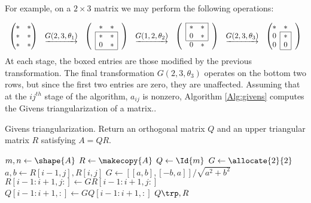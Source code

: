 For example, on a $2 \times 3$ matrix we may perform the following operations:

\def\mc#1{\multicolumn{1}{c|}{#1}}
\def\lc#1{\multicolumn{1}{|c}{#1}}
\[
\begin{array}{ccccccc}
\begin{pmatrix}
*&*\\
*&*\\
*&*
\end{pmatrix}
&
\underrightarrow{G(2,3,\theta_1)}
&\begin{pmatrix}
&*&*&\\ \cline{2-3}
&\lc{*}&\mc{*}&\\
&\lc{0}&\mc{*}& \\ \cline{2-3}
\end{pmatrix}
&
\underrightarrow{G(1,2,\theta_2)}
& \begin{pmatrix} \cline{2-3}
&\lc{*}&\mc{*}&\\
&\lc{0}&\mc{*}&\\ \cline{2-3}
&0&*&
\end{pmatrix}
&
\underrightarrow{G(2,3,\theta_3)}
&\begin{pmatrix}
*&*&\\ \cline{2-2}
\mc{0}&\mc{*}&\\
\mc{0}&\mc{0}&\\ \cline{2-2}
\end{pmatrix}
\end{array}
\]
At each stage, the boxed entries are those modified by the previous transformation. 
The final transformation $G(2,3,\theta_3)$ operates on the bottom two rows, but since the first two entries are zero, they are unaffected. 
Assuming that at the $ij^{th}$ stage of the algorithm, $a_{ij}$ is nonzero, Algorithm \ref{Alg:givens} computes the Givens triangularization of a matrix..


\begin{algorithm}
\begin{algorithmic}[1]
\caption{Givens triangularization. Return an orthogonal matrix $Q$ and an upper triangular matrix $R$ satisfying $A = QR$.}
\label{Alg:givens}
\State $m, n \gets \shape{A}$
\State $R \gets \makecopy{A}$
\State $Q \gets \Id{m}$
\State $G \gets \allocate{2}{2}$
      \State $a, b \gets R[i-1,j], R[i,j]$
      \State $G \gets [[a, b],[-b,a]]/\sqrt{a^2+b^2}$
      \State $R[i-1:i+1, j:] \gets GR[i-1:i+1, j:]$
      \State $Q[i-1:i+1,:] \gets GQ[i-1:i+1,:]$
    \EndFor
\EndFor
\State {} $Q\trp , R$
\EndProcedure
\end{algorithmic}
\end{algorithm}

